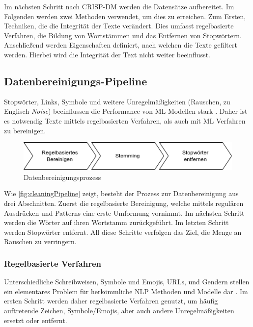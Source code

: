 Im nächsten Schritt nach \ac{CRISP-DM} werden die Datensätze aufbereitet. Im Folgenden werden zwei Methoden verwendet, um dies zu erreichen. Zum Ersten, Techniken, die die Integrität der Texte verändert. Dies umfasst regelbasierte Verfahren, die Bildung von Wortstämmen und das Entfernen von Stopwörtern. Anschließend werden Eigenschaften definiert, nach welchen die Texte gefiltert werden. Hierbei wird die Integrität der Text nicht weiter beeinflusst.

\subsection{Datenbereinigungs-Pipeline} \label{subsec:cleaningPipeline}

Stopwörter, Links, Symbole und weitere Unregelmäßigkeiten (Rauschen, zu Englisch \textit{Noise}) beeinflussen die Performance von \ac{ML} Modellen stark \autocite[4]{kowsari_text_2019}. Daher ist es notwendig Texte mittels regelbasierten Verfahren, als auch mit \ac{ML} Verfahren zu bereinigen. 


\begin{figure}[H]
    \centering
    \includegraphics[width=0.7\linewidth]{data/images/cleaning_pipeline_v1.png}
    \caption{Datenbereinigungsprozess} \label{fig:cleaningPipeline}
\end{figure}

Wie \autoref{fig:cleaningPipeline} zeigt, besteht der Prozess zur Datenbereinigung aus drei Abschnitten. Zuerst die regelbasierte Bereinigung, welche mittels regulären Ausdrücken und Patterns eine erste Umformung vornimmt. Im nächsten Schritt werden die Wörter auf ihren Wortstamm zurückgeführt. Im letzten Schritt werden Stopwörter entfernt. All diese Schritte verfolgen das Ziel, die Menge an Rauschen zu verringern. 

\subsubsection{Regelbasierte Verfahren}

Unterschiedliche Schreibweisen, Symbole und Emojis, \acp{URL}, und Gendern stellen ein elementares Problem für herkömmliche \ac{NLP} Methoden und Modelle dar \autocite[4\psq]{kowsari_text_2019}. Im ersten Schritt werden daher regelbasierte Verfahren genutzt, um häufig auftretende Zeichen, Symbole/Emojis, aber auch andere Unregelmäßigkeiten ersetzt oder entfernt.


